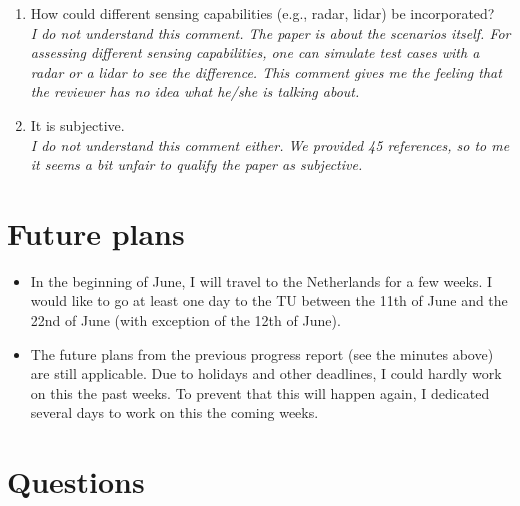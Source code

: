 \documentclass[10pt,final,a4paper,oneside,onecolumn]{article}
\begin{document}
\begin{itemize}
\begin{enumerate}
		\item How could different sensing capabilities (e.g., radar, lidar) be incorporated?\\
		\textit{I do not understand this comment. The paper is about the scenarios itself. For assessing different sensing capabilities, one can simulate test cases with a radar or a lidar to see the difference. This comment gives me the feeling that the reviewer has no idea what he/she is talking about.}
		
		\item It is subjective. \\
		\textit{I do not understand this comment either. We provided 45 references, so to me it seems a bit unfair to qualify the paper as subjective.}
	\end{enumerate}
\end{itemize}

\section{Future plans}

\begin{itemize}
	\item In the beginning of June, I will travel to the Netherlands for a few weeks. I would like to go at least one day to the TU between the 11th of June and the 22nd of June (with exception of the 12th of June).
	
	\item The future plans from the previous progress report (see the minutes above) are still applicable. Due to holidays and other deadlines, I could hardly work on this the past weeks. To prevent that this will happen again, I dedicated several days to work on this the coming weeks.
\end{itemize}

\section{Questions}
\end{document}
